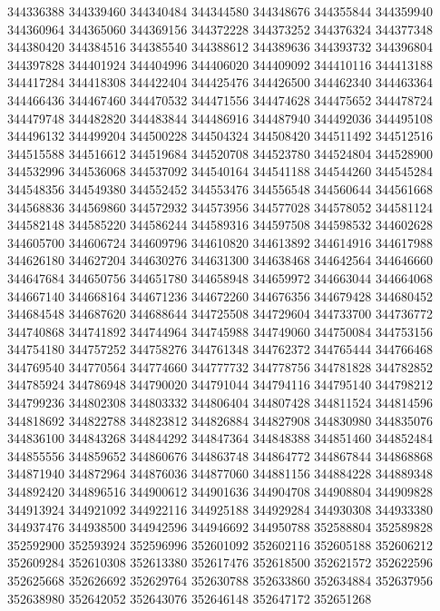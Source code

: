 { 344336388
 344339460
 344340484
 344344580
 344348676
 344355844
 344359940
 344360964
 344365060
 344369156
 344372228
 344373252
 344376324
 344377348
 344380420
 344384516
 344385540
 344388612
 344389636
 344393732
 344396804
 344397828
 344401924
 344404996
 344406020
 344409092
 344410116
 344413188
 344417284
 344418308
 344422404
 344425476
 344426500
 344462340
 344463364
 344466436
 344467460
 344470532
 344471556
 344474628
 344475652
 344478724
 344479748
 344482820
 344483844
 344486916
 344487940
 344492036
 344495108
 344496132
 344499204
 344500228
 344504324
 344508420
 344511492
 344512516
 344515588
 344516612
 344519684
 344520708
 344523780
 344524804
 344528900
 344532996
 344536068
 344537092
 344540164
 344541188
 344544260
 344545284
 344548356
 344549380
 344552452
 344553476
 344556548
 344560644
 344561668
 344568836
 344569860
 344572932
 344573956
 344577028
 344578052
 344581124
 344582148
 344585220
 344586244
 344589316
 344597508
 344598532
 344602628
 344605700
 344606724
 344609796
 344610820
 344613892
 344614916
 344617988
 344626180
 344627204
 344630276
 344631300
 344638468
 344642564
 344646660
 344647684
 344650756
 344651780
 344658948
 344659972
 344663044
 344664068
 344667140
 344668164
 344671236
 344672260
 344676356
 344679428
 344680452
 344684548
 344687620
 344688644
 344725508
 344729604
 344733700
 344736772
 344740868
 344741892
 344744964
 344745988
 344749060
 344750084
 344753156
 344754180
 344757252
 344758276
 344761348
 344762372
 344765444
 344766468
 344769540
 344770564
 344774660
 344777732
 344778756
 344781828
 344782852
 344785924
 344786948
 344790020
 344791044
 344794116
 344795140
 344798212
 344799236
 344802308
 344803332
 344806404
 344807428
 344811524
 344814596
 344818692
 344822788
 344823812
 344826884
 344827908
 344830980
 344835076
 344836100
 344843268
 344844292
 344847364
 344848388
 344851460
 344852484
 344855556
 344859652
 344860676
 344863748
 344864772
 344867844
 344868868
 344871940
 344872964
 344876036
 344877060
 344881156
 344884228
 344889348
 344892420
 344896516
 344900612
 344901636
 344904708
 344908804
 344909828
 344913924
 344921092
 344922116
 344925188
 344929284
 344930308
 344933380
 344937476
 344938500
 344942596
 344946692
 344950788
 352588804
 352589828
 352592900
 352593924
 352596996
 352601092
 352602116
 352605188
 352606212
 352609284
 352610308
 352613380
 352617476
 352618500
 352621572
 352622596
 352625668
 352626692
 352629764
 352630788
 352633860
 352634884
 352637956
 352638980
 352642052
 352643076
 352646148
 352647172
 352651268
}
